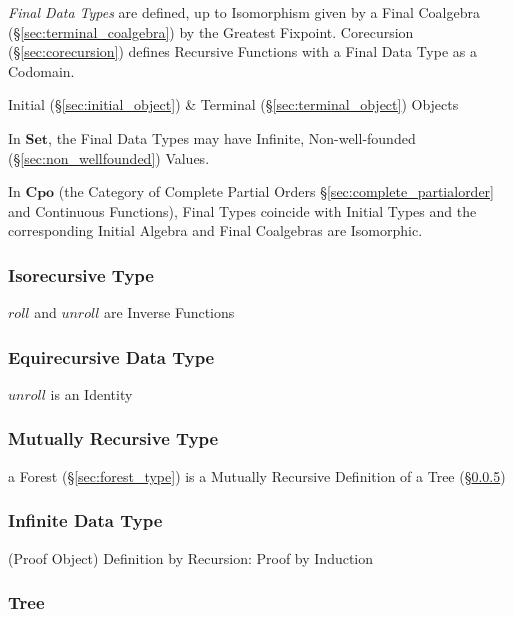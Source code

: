 \emph{Final Data Types} are defined, up to Isomorphism given by a
Final Coalgebra (\S\ref{sec:terminal_coalgebra}) by the Greatest
Fixpoint. Corecursion (\S\ref{sec:corecursion}) defines Recursive
Functions with a Final Data Type as a Codomain.

Initial (\S\ref{sec:initial_object}) \& Terminal
(\S\ref{sec:terminal_object}) Objects

In $\mathbf{Set}$, the Final Data Types may have Infinite,
Non-well-founded (\S\ref{sec:non_wellfounded}) Values.

In $\mathbf{Cpo}$ (the Category of Complete Partial Orders
\S\ref{sec:complete_partialorder} and Continuous Functions), Final
Types coincide with Initial Types and the corresponding Initial
Algebra and Final Coalgebras are Isomorphic.



\subsubsection{Isorecursive Type}\label{sec:isorecursive_type}

$roll$ and $unroll$ are Inverse Functions



\subsubsection{Equirecursive Data Type}\label{sec:equirecursive_type}

$unroll$ is an Identity



\subsubsection{Mutually Recursive Type}
\label{sec:mutually_recursive}\hfill

a Forest (\S\ref{sec:forest_type}) is a Mutually Recursive Definition
of a Tree (\S\ref{sec:tree_type})



\subsubsection{Infinite Data Type}\label{sec:infinite_datatype}

(Proof Object) Definition by Recursion: Proof by Induction



\subsubsection{Tree}\label{sec:tree_type}

